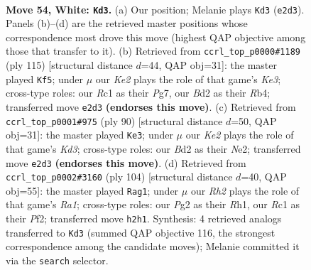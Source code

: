 \documentclass[11pt]{article}
\begin{document}
\clearpage

\begin{figure}[p]\centering
\begin{subfigure}{0.46\textwidth}\centering
\resizebox{\linewidth}{!}{%
\newchessgame
\chessboard[
  setfen={7r/p7/1pr1p1kp/n7/2P1P3/N7/P2BK1PR/2R5 w - - 1 54},
  showmover=false,
  pgfstyle=straightmove, color=movearrow, markmove={e2-d3}
]}
\caption{}
\end{subfigure}\hfill
\begin{subfigure}{0.46\textwidth}\centering
\resizebox{\linewidth}{!}{%
\newchessgame
\chessboard[
  setfen={8/6p1/r3k3/P1R1p1p1/1rN1p1n1/6P1/5P2/R5K1 b - - 27 58},
  showmover=false,
  pgfstyle=straightmove, color=movearrow, markmove={e6-f5}
]}
\caption{}
\end{subfigure}
\\[4pt]
\begin{subfigure}{0.46\textwidth}\centering
\resizebox{\linewidth}{!}{%
\newchessgame
\chessboard[
  setfen={1k6/1p1r4/6p1/r1n2p2/PR1P3p/3K3P/4N1P1/1R6 w - - 2 46},
  showmover=false,
  pgfstyle=straightmove, color=movearrow, markmove={d3-e3}
]}
\caption{}
\end{subfigure}\hfill
\begin{subfigure}{0.46\textwidth}\centering
\resizebox{\linewidth}{!}{%
\newchessgame
\chessboard[
  setfen={8/2pr4/r1n1k1p1/p7/1p1P1B2/1PP2K2/5P2/R6R w - - 0 53},
  showmover=false,
  pgfstyle=straightmove, color=movearrow, markmove={a1-g1}
]}
\caption{}
\end{subfigure}
\caption{\textbf{Move 54, White: \texttt{Kd3}.} (a) Our position; Melanie plays \texttt{Kd3} (\texttt{e2d3}). Panels (b)--(d) are the retrieved master positions whose correspondence most drove this move (highest QAP objective among those that transfer to it). (b) Retrieved from \texttt{ccrl\_top\_p0000\#1189} (ply 115) [structural distance $d$=44, QAP obj=31]: the master played \texttt{Kf5}; under $\mu$ our \emph{Ke2} plays the role of that game's \emph{Ke3}; cross-type roles: our \emph{R}c1 as their \emph{P}g7, our \emph{B}d2 as their \emph{R}b4; transferred move \texttt{e2d3} \textbf{(endorses this move)}. (c) Retrieved from \texttt{ccrl\_top\_p0001\#975} (ply 90) [structural distance $d$=50, QAP obj=31]: the master played \texttt{Ke3}; under $\mu$ our \emph{Ke2} plays the role of that game's \emph{Kd3}; cross-type roles: our \emph{B}d2 as their \emph{N}e2; transferred move \texttt{e2d3} \textbf{(endorses this move)}. (d) Retrieved from \texttt{ccrl\_top\_p0002\#3160} (ply 104) [structural distance $d$=40, QAP obj=55]: the master played \texttt{Rag1}; under $\mu$ our \emph{Rh2} plays the role of that game's \emph{Ra1}; cross-type roles: our \emph{P}g2 as their \emph{R}h1, our \emph{R}c1 as their \emph{P}f2; transferred move \texttt{h2h1}. Synthesis: 4 retrieved analogs transferred to \texttt{Kd3} (summed QAP objective 116, the strongest correspondence among the candidate moves); Melanie committed it via the \texttt{search} selector.}
\label{fig:thought-m106}
\end{figure}
\end{document}
